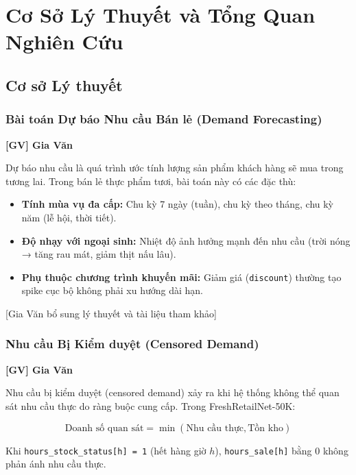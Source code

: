 \documentclass[12pt,a4paper]{report}
\newcommand{\ownerGV}{\colorbox{green!20}{\textbf{[GV] Gia Văn}}}
\begin{document}
\chapter{Cơ Sở Lý Thuyết và Tổng Quan Nghiên Cứu}

\section{Cơ sở Lý thuyết}

\subsection{Bài toán Dự báo Nhu cầu Bán lẻ (Demand Forecasting)}
\ownerGV

Dự báo nhu cầu là quá trình ước tính lượng sản phẩm khách hàng sẽ mua trong tương lai. Trong bán lẻ thực phẩm tươi, bài toán này có các đặc thù:

\begin{itemize}
    \item \textbf{Tính mùa vụ đa cấp:} Chu kỳ 7 ngày (tuần), chu kỳ theo tháng, chu kỳ năm (lễ hội, thời tiết).
    \item \textbf{Độ nhạy với ngoại sinh:} Nhiệt độ ảnh hưởng mạnh đến nhu cầu (trời nóng → tăng rau mát, giảm thịt nấu lâu).
    \item \textbf{Phụ thuộc chương trình khuyến mãi:} Giảm giá (\texttt{discount}) thường tạo spike cục bộ không phải xu hướng dài hạn.
\end{itemize}

[Gia Văn bổ sung lý thuyết và tài liệu tham khảo]

\subsection{Nhu cầu Bị Kiểm duyệt (Censored Demand)}
\ownerGV

Nhu cầu bị kiểm duyệt (censored demand) xảy ra khi hệ thống không thể quan sát nhu cầu thực do ràng buộc cung cấp. Trong FreshRetailNet-50K:

\[
\text{Doanh số quan sát} = \min(\text{Nhu cầu thực}, \text{Tồn kho})
\]

Khi \texttt{hours\_stock\_status[h] = 1} (hết hàng giờ $h$), \texttt{hours\_sale[h]} bằng 0 không phản ánh nhu cầu thực.
\end{document}

